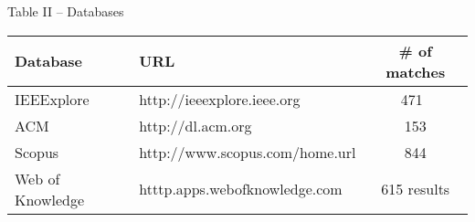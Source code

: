 \centering
Table II – Databases

\begin{tabular}{l l c }
    \bfseries{Database} & \bfseries{URL} & \bfseries{\# of matches} \\
    \hline
    IEEExplore & http://ieeexplore.ieee.org & 471 \\
    ACM & http://dl.acm.org & 153 \\
    Scopus & http://www.scopus.com/home.url & 844 \\
    Web of Knowledge & htttp.apps.webofknowledge.com &  615 results \\
    \hline
\end{tabular}

\justify
